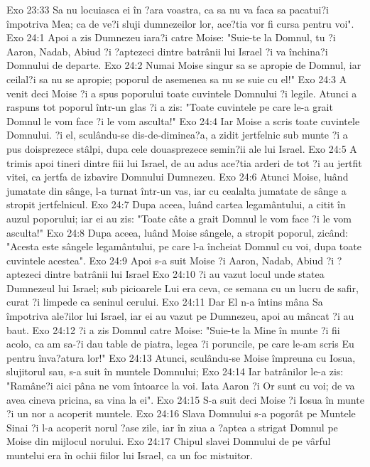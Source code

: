 Exo 23:33  Sa nu locuiasca ei în ?ara voastra, ca sa nu va faca sa pacatui?i împotriva Mea; ca de ve?i sluji dumnezeilor lor, ace?tia vor fi cursa pentru voi".
Exo 24:1  Apoi a zis Dumnezeu iara?i catre Moise: "Suie-te la Domnul, tu ?i Aaron, Nadab, Abiud ?i ?aptezeci dintre batrânii lui Israel ?i va închina?i Domnului de departe.
Exo 24:2  Numai Moise singur sa se apropie de Domnul, iar ceilal?i sa nu se apropie; poporul de asemenea sa nu se suie cu el!"
Exo 24:3  A venit deci Moise ?i a spus poporului toate cuvintele Domnului ?i legile. Atunci a raspuns tot poporul într-un glas ?i a zis: "Toate cuvintele pe care le-a grait Domnul le vom face ?i le vom asculta!"
Exo 24:4  Iar Moise a scris toate cuvintele Domnului. ?i el, sculându-se dis-de-diminea?a, a zidit jertfelnic sub munte ?i a pus doisprezece stâlpi, dupa cele douasprezece semin?ii ale lui Israel.
Exo 24:5  A trimis apoi tineri dintre fiii lui Israel, de au adus ace?tia arderi de tot ?i au jertfit vitei, ca jertfa de izbavire Domnului Dumnezeu.
Exo 24:6  Atunci Moise, luând jumatate din sânge, l-a turnat într-un vas, iar cu cealalta jumatate de sânge a stropit jertfelnicul.
Exo 24:7  Dupa aceea, luând cartea legamântului, a citit în auzul poporului; iar ei au zis: "Toate câte a grait Domnul le vom face ?i le vom asculta!"
Exo 24:8  Dupa aceea, luând Moise sângele, a stropit poporul, zicând: "Acesta este sângele legamântului, pe care l-a încheiat Domnul cu voi, dupa toate cuvintele acestea".
Exo 24:9  Apoi s-a suit Moise ?i Aaron, Nadab, Abiud ?i ?aptezeci dintre batrânii lui Israel
Exo 24:10  ?i au vazut locul unde statea Dumnezeul lui Israel; sub picioarele Lui era ceva, ce semana cu un lucru de safir, curat ?i limpede ca seninul cerului.
Exo 24:11  Dar El n-a întins mâna Sa împotriva ale?ilor lui Israel, iar ei au vazut pe Dumnezeu, apoi au mâncat ?i au baut.
Exo 24:12  ?i a zis Domnul catre Moise: "Suie-te la Mine în munte ?i fii acolo, ca am sa-?i dau table de piatra, legea ?i poruncile, pe care le-am scris Eu pentru înva?atura lor!"
Exo 24:13  Atunci, sculându-se Moise împreuna cu Iosua, slujitorul sau, s-a suit în muntele Domnului;
Exo 24:14  Iar batrânilor le-a zis: "Ramâne?i aici pâna ne vom întoarce la voi. Iata Aaron ?i Or sunt cu voi; de va avea cineva pricina, sa vina la ei".
Exo 24:15  S-a suit deci Moise ?i Iosua în munte ?i un nor a acoperit muntele.
Exo 24:16  Slava Domnului s-a pogorât pe Muntele Sinai ?i l-a acoperit norul ?ase zile, iar în ziua a ?aptea a strigat Domnul pe Moise din mijlocul norului.
Exo 24:17  Chipul slavei Domnului de pe vârful muntelui era în ochii fiilor lui Israel, ca un foc mistuitor.
